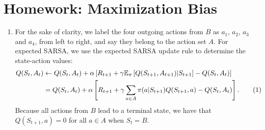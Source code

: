 \documentclass{article}
\newcommand\numberthis{\addtocounter{equation}{1}\tag{\theequation}}
\begin{document}
\section*{Homework: Maximization Bias}
\begin{enumerate}
	\item \label{q:5.4.1} For the sake of clarity, we label the four outgoing actions from $B$ as $a_1$, $a_2$, $a_3$
	      and $a_4$, from left to right, and say they belong to the action set $A$. For expected
	      SARSA, we use the expected SARSA update rule to determine the state-action values:
	      \begin{align*}
		      Q(S_t, A_t) & \leftarrow Q(S_t, A_t) + \alpha \left[ R_{t+1} + \gamma \mathbb{E}_\pi
		      \left[Q(S_{t+1}, A_{t+1})|S_{t+1}\right]  - Q(S_t, A_t) \right]                            \\
		                  & = Q(S_t, A_t) + \alpha \left[ R_{t+1} + \gamma \sum_{a \in A} \pi(a|S_{t+1})
			      Q(S_{t+1}, a) - Q(S_t, A_t) \right]. \numberthis \label{eq:expected_sarsa_update}
	      \end{align*}
	      Because all actions from $B$ lead to a terminal state, we have that $Q(S_{t+1}, a) = 0$ for
	      all $a \in A$ when $S_t = B$.


\end{enumerate}
\end{document}
